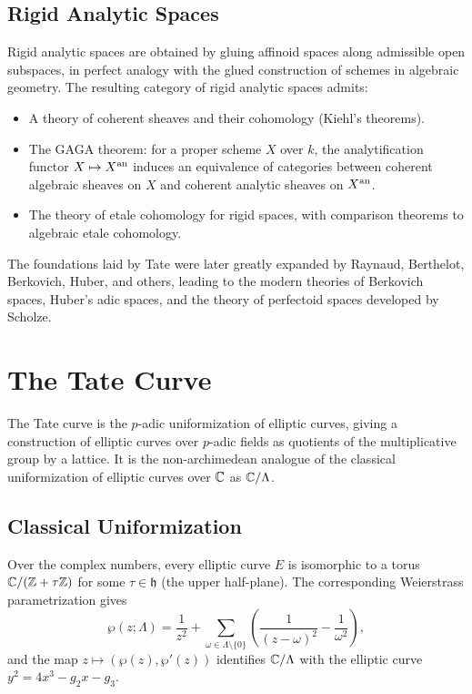 \subsection{Rigid Analytic Spaces}

Rigid analytic spaces are obtained by gluing affinoid spaces along admissible open subspaces, in perfect analogy with the glued construction of schemes in algebraic geometry. The resulting category of rigid analytic spaces admits:
\begin{itemize}
    \item A theory of coherent sheaves and their cohomology (Kiehl's theorems).
    \item The GAGA theorem: for a proper scheme \(X\) over \(k\), the analytification functor \(X \mapsto X^{\operatorname{an}}\) induces an equivalence of categories between coherent algebraic sheaves on \(X\) and coherent analytic sheaves on \(X^{\operatorname{an}}\).
    \item The theory of etale cohomology for rigid spaces, with comparison theorems to algebraic etale cohomology.
\end{itemize}

The foundations laid by Tate were later greatly expanded by Raynaud, Berthelot, Berkovich, Huber, and others, leading to the modern theories of Berkovich spaces, Huber's adic spaces, and the theory of perfectoid spaces developed by Scholze.

\section{The Tate Curve}

The Tate curve is the \(p\)-adic uniformization of elliptic curves, giving a construction of elliptic curves over \(p\)-adic fields as quotients of the multiplicative group by a lattice. It is the non-archimedean analogue of the classical uniformization of elliptic curves over \(\mathbb{C}\) as \(\mathbb{C}/\Lambda\).

\subsection{Classical Uniformization}

Over the complex numbers, every elliptic curve \(E\) is isomorphic to a torus \(\mathbb{C}/(\mathbb{Z} + \tau\mathbb{Z})\) for some \(\tau \in \mathfrak{h}\) (the upper half-plane). The corresponding Weierstrass parametrization gives
\[
\wp(z; \Lambda) = \frac{1}{z^2} + \sum_{\omega \in \Lambda \setminus \{0\}} \left( \frac{1}{(z-\omega)^2} - \frac{1}{\omega^2} \right),
\]
and the map \(z \mapsto (\wp(z), \wp'(z))\) identifies \(\mathbb{C}/\Lambda\) with the elliptic curve \(y^2 = 4x^3 - g_2 x - g_3\).

